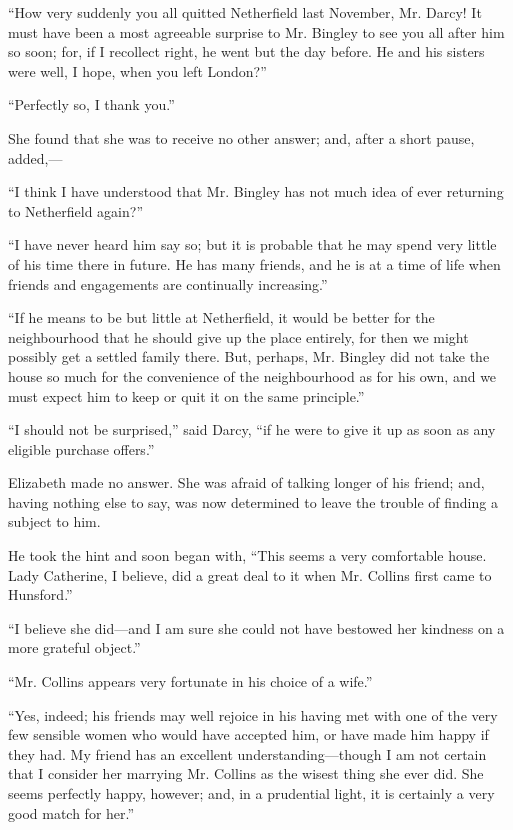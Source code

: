 ``How very suddenly you all quitted Netherfield last November, Mr. Darcy! It must have been a most agreeable surprise to Mr. Bingley to see you all after him so soon; for, if I recollect right, he went but the day before. He and his sisters were well, I hope, when you left London?''

``Perfectly so, I thank you.''

She found that she was to receive no other answer; and, after a short pause, added,---

``I think I have understood that Mr. Bingley has not much idea of ever returning to Netherfield again?''

``I have never heard him say so; but it is probable that he may spend very little of his time there in future. He has many friends, and he is at a time of life when friends and engagements are continually increasing.''

``If he means to be but little at Netherfield, it would be better for the neighbourhood that he should give up the place entirely, for then we might possibly get a settled family there. But, perhaps, Mr. Bingley did not take the house so much for the convenience of the neighbourhood as for his own, and we must expect him to keep or quit it on the same principle.''

``I should not be surprised,'' said Darcy, ``if he were to give it up as soon as any eligible purchase offers.''

Elizabeth made no answer. She was afraid of talking longer of his friend; and, having nothing else to say, was now determined to leave the trouble of finding a subject to him.

He took the hint and soon began with, ``This seems a very comfortable house. Lady Catherine, I believe, did a great deal to it when Mr. Collins first came to Hunsford.''

``I believe she did---and I am sure she could not have bestowed her kindness on a more grateful object.''

``Mr. Collins appears very fortunate in his choice of a wife.''

``Yes, indeed; his friends may well rejoice in his having met with one of the very few sensible women who would have accepted him, or have made him happy if they had. My friend has an excellent understanding---though I am not certain that I consider her marrying Mr. Collins as the wisest thing she ever did. She seems perfectly happy, however; and, in a prudential light, it is certainly a very good match for her.''

